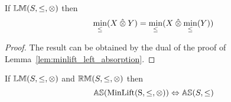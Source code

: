 \vspace{2em}




\begin{lemma} \label{lem:minlift_right_absorption}
If ${\mathbb{LM}}(S,\leq,\otimes)$ then
\begin{equation*}
\min_\leq(X \mathbin{\hat{\otimes}} Y) = \min_\leq(X \mathbin{\hat{\otimes}} \min_\leq(Y))
\end{equation*}
\end{lemma}

\begin{proof} The result can be obtained by the dual of the proof of Lemma~\ref{lem:minlift_left_absorption}.
\end{proof}
 




\begin{theorem} \label{thm:minlift_as}
If ${\mathbb{LM}}(S,\leq,\otimes)$ and ${\mathbb{RM}}(S,\leq,\otimes)$ then
\begin{equation*}
{\mathbb{AS}}(\mathrm{MinLift(S,\leq,\otimes)}) \Leftrightarrow {\mathbb{AS}}(S,\leq)
\end{equation*}
\end{theorem}


